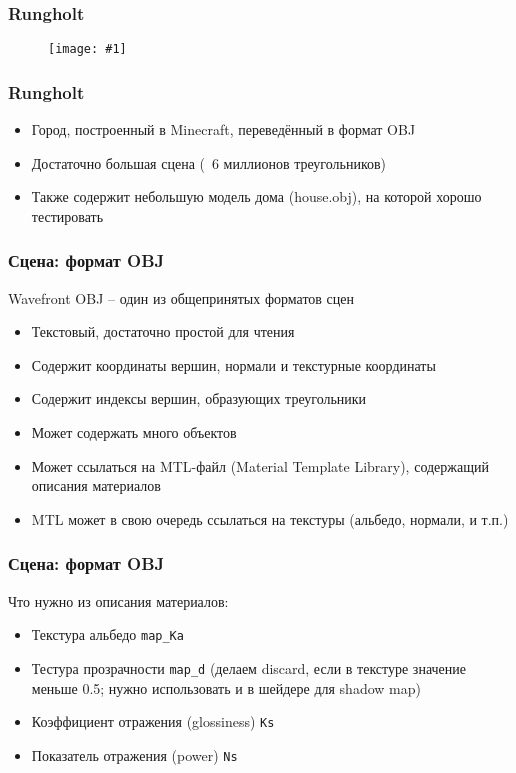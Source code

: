 \documentclass[10pt]{beamer}
\newcommand{\slideimage}[1]{
  \begin{figure}
    \begin{adjustbox}{width=\textwidth, totalheight=\textheight-2\baselineskip-2\baselineskip,keepaspectratio}
      \texttt{[image: \#1]}
    \end{adjustbox}
  \end{figure}
}
\begin{document}
\begin{frame}[fragile]
\frametitle{Rungholt}
\slideimage{rungholt.png}
\end{frame}

\begin{frame}[fragile]
\frametitle{Rungholt}
\begin{itemize}
\item Город, построенный в Minecraft, переведённый в формат OBJ
\item Достаточно большая сцена (~6 миллионов треугольников)
\item Также содержит небольшую модель дома (house.obj), на которой хорошо тестировать
\end{itemize}
\end{frame}

\begin{frame}[fragile]
\frametitle{Сцена: формат OBJ}
Wavefront OBJ -- один из общепринятых форматов сцен
\begin{itemize}
\item Текстовый, достаточно простой для чтения
\item Содержит координаты вершин, нормали и текстурные координаты
\item Содержит индексы вершин, образующих треугольники
\item Может содержать много объектов
\item Может ссылаться на MTL-файл (Material Template Library), содержащий описания материалов
\item MTL может в свою очередь ссылаться на текстуры (альбедо, нормали, и т.п.)
\end{itemize}
\end{frame}

\begin{frame}[fragile]
\frametitle{Сцена: формат OBJ}
Что нужно из описания материалов:
\begin{itemize}
\item Текстура альбедо \verb|map_Ka|
\item Тестура прозрачности \verb|map_d| (делаем discard, если в текстуре значение меньше 0.5; нужно использовать и в шейдере для shadow map)
\item Коэффициент отражения (glossiness) \verb|Ks|
\item Показатель отражения (power) \verb|Ns|
\end{itemize}
\end{frame}
\end{document}
